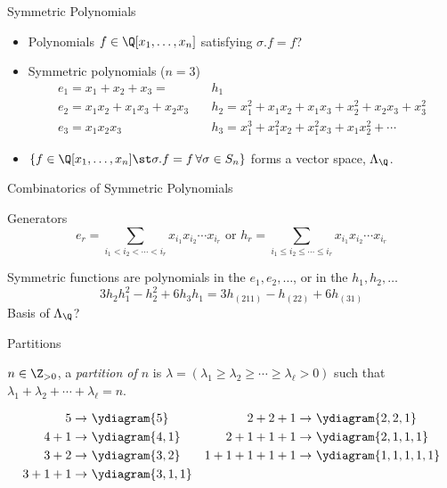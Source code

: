 \documentclass{beamer}
\newcommand{\sym}{\Lambda}
\begin{document}
\begin{frame}{Symmetric Polynomials}
  \begin{itemize}
    \item Polynomials \(f \in \Q[x_1,\ldots,x_n]\) satisfying \(\sigma.f
    = f\)? \pause
  \item Symmetric polynomials (\(n=3\))
    \begin{align*}
      e_1 = x_1 + x_2 + x_3 = & h_1  \\
      e_2 = x_1 x_2 + x_1 x_3 + x_2 x_3 \quad & h_2 = x_1^2 + x_1 x_2 + x_1
                                          x_3 + x_2^2 +  x_2 x_3 +x_3^2  \\
      e_3 = x_1 x_2 x_3 \quad & h_3 = x_1^3 + x_1^2 x_2 + x_1^2 x_3 + x_1
                          x_2^2 + \cdots
    \end{align*} \pause
  \item \(\{f \in \Q[x_1,\ldots,x_n] \st \sigma.f = f \, \forall \sigma
    \in S_n\}\) forms a vector space, \(\sym_\Q\).
\end{itemize}
\end{frame}
\begin{frame}{Combinatorics of Symmetric Polynomials}
  \begin{block}{Generators}
    \[
      e_r =
      \sum_{i_1 < i_2 < \cdots < i_r} x_{i_1} x_{i_2} \cdots x_{i_r}
      \text { or }
      h_r = 
      \sum_{i_1 \leq i_2 \leq \cdots \leq i_r} x_{i_1} x_{i_2} \cdots x_{i_r}
    \]\pause 
  \end{block}
    Symmetric functions are polynomials in the \(e_1,e_2,\ldots\), or
    in the \(h_1,h_2,\ldots\) \[
     3 h_2 h_1^2 - h_2^2 + 6 h_3 h_1 = 3 h_{(211)} - h_{(22)} + 6 h_{(31)}
    \]
    \pause
    Basis of \(\sym_\Q\)?
\end{frame}
\begin{frame}{Partitions}
  \begin{definition}
    \(n \in \Z_{>0}\), a \emph{partition of \(n\)} is
    \(\lambda = (\lambda_1 \geq
    \lambda_2 \geq \cdots \geq \lambda_\ell > 0)\) such that
    \(\lambda_1+\lambda_2 + \cdots + \lambda_\ell = n \).
  \end{definition}\pause
  \begin{align*}
    5 \to &\ \ydiagram{5} & 
    2+2+1 \to&\ \ydiagram{2,2,1}\\
    4+1 \to &\ \ydiagram{4,1}&
    2+1+1+1 \to&\ \ydiagram{2,1,1,1} \\
    3+2 \to &\ \ydiagram{3,2}&
    1+1+1+1+1 \to&\ \ydiagram{1,1,1,1,1}\\
    3+1+1 \to &\ \ydiagram{3,1,1}
  \end{align*}
\end{frame}
\end{document}
